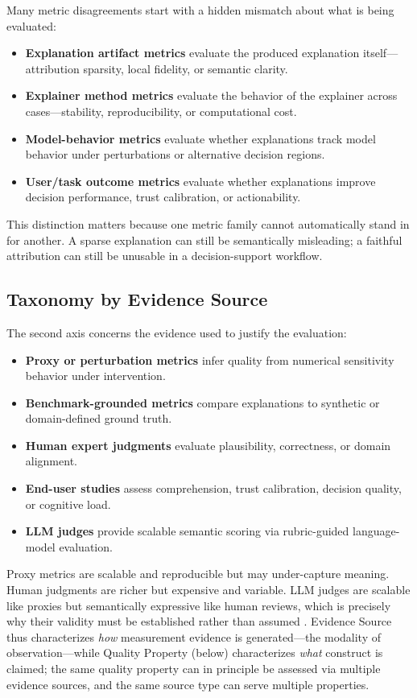\documentclass[twoside,11pt]{article}
\begin{document}
Many metric disagreements start with a hidden mismatch about what is
being evaluated:
\begin{itemize}[leftmargin=*]
\item \textbf{Explanation artifact metrics} evaluate the produced
explanation itself---attribution sparsity, local fidelity, or semantic
clarity.
\item \textbf{Explainer method metrics} evaluate the behavior of the
explainer across cases---stability, reproducibility, or computational
cost.
\item \textbf{Model-behavior metrics} evaluate whether explanations track
model behavior under perturbations or alternative decision regions.
\item \textbf{User/task outcome metrics} evaluate whether explanations
improve decision performance, trust calibration, or actionability.
\end{itemize}

This distinction matters because one metric family cannot automatically
stand in for another. A sparse explanation can still be semantically
misleading; a faithful attribution can still be unusable in a
decision-support workflow.

\subsection{Taxonomy by Evidence Source}

The second axis concerns the evidence used to justify the evaluation:
\begin{itemize}[leftmargin=*]
\item \textbf{Proxy or perturbation metrics} infer quality from numerical
sensitivity behavior under intervention.
\item \textbf{Benchmark-grounded metrics} compare explanations to
synthetic or domain-defined ground truth.
\item \textbf{Human expert judgments} evaluate plausibility, correctness,
or domain alignment.
\item \textbf{End-user studies} assess comprehension, trust calibration,
decision quality, or cognitive load.
\item \textbf{LLM judges} provide scalable semantic scoring via
rubric-guided language-model evaluation.
\end{itemize}

Proxy metrics are scalable and reproducible but may under-capture meaning.
Human judgments are richer but expensive and variable. LLM judges are
scalable like proxies but semantically expressive like human reviews,
which is precisely why their validity must be established rather than
assumed \citep{gu2024llmjudge,wu2025userperceptions,zhou2025medthink}.
Evidence Source thus characterizes \emph{how} measurement evidence is generated---the modality of observation---while Quality Property (below) characterizes \emph{what} construct is claimed; the same quality property can in principle be assessed via multiple evidence sources, and the same source type can serve multiple properties.
\end{document}
